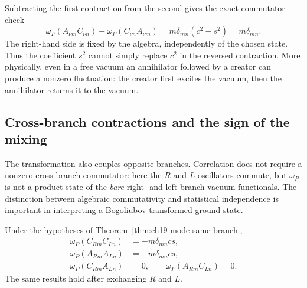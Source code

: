 Subtracting the first contraction from the second gives the exact
commutator check
\begin{equation}
 \omega_P(A_{\nu m}C_{\nu n})
 -\omega_P(C_{\nu n}A_{\nu m})
 =m\delta_{mn}(c^2-s^2)=m\delta_{mn}.
 \label{eq:ch19-mode-commutator-check}
\end{equation}
The right-hand side is fixed by the algebra, independently of the
chosen state. Thus the coefficient $s^2$ cannot simply replace
$c^2$ in the reversed contraction. More physically, even in a free
vacuum an annihilator followed by a creator can produce a nonzero
fluctuation: the creator first excites the vacuum, then the annihilator
returns it to the vacuum.

\subsection{Cross-branch contractions and the sign of the mixing}

The transformation also couples opposite branches. Correlation does not
require a nonzero cross-branch commutator: here the $R$ and $L$
oscillators commute, but $\omega_P$ is not a product state of the
\emph{bare} right- and left-branch vacuum functionals. The distinction
between algebraic commutativity and statistical independence is
important in interpreting a Bogoliubov-transformed ground state.

\begin{theorem}
\label{thm:ch19-mode-cross-branch}
Under the hypotheses of Theorem~\ref{thm:ch19-mode-same-branch},
\begin{align}
 \omega_P(C_{Rm}C_{Ln})
   &=-m\delta_{mn}cs,
   \label{eq:ch19-cross-CC}\\
 \omega_P(A_{Rm}A_{Ln})
   &=-m\delta_{mn}cs,
   \label{eq:ch19-cross-AA}\\
 \omega_P(C_{Rm}A_{Ln})
   &=0,\qquad
 \omega_P(A_{Rm}C_{Ln})=0.
   \label{eq:ch19-cross-mixed}
\end{align}
The same results hold after exchanging $R$ and $L$.
\end{theorem}

